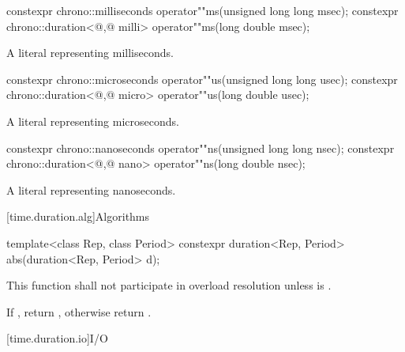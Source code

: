%
\begin{itemdecl}
constexpr chrono::milliseconds                 operator""ms(unsigned long long msec);
constexpr chrono::duration<@\unspec,@ milli> operator""ms(long double msec);
\end{itemdecl}

\begin{itemdescr}
\pnum
\returns
A  literal representing  milliseconds.
\end{itemdescr}

%
\begin{itemdecl}
constexpr chrono::microseconds                 operator""us(unsigned long long usec);
constexpr chrono::duration<@\unspec,@ micro> operator""us(long double usec);
\end{itemdecl}

\begin{itemdescr}
\pnum
\returns
A  literal representing  microseconds.
\end{itemdescr}

%
\begin{itemdecl}
constexpr chrono::nanoseconds                 operator""ns(unsigned long long nsec);
constexpr chrono::duration<@\unspec,@ nano> operator""ns(long double nsec);
\end{itemdecl}

\begin{itemdescr}
\pnum
\returns
A  literal representing  nanoseconds.
\end{itemdescr}

[time.duration.alg]{Algorithms}

%
\begin{itemdecl}
template<class Rep, class Period>
  constexpr duration<Rep, Period> abs(duration<Rep, Period> d);
\end{itemdecl}

\begin{itemdescr}
\pnum
\remarks
This function shall not participate in overload resolution
unless  is .

\pnum
\returns
If , return ,
otherwise return .
\end{itemdescr}

[time.duration.io]{I/O}

